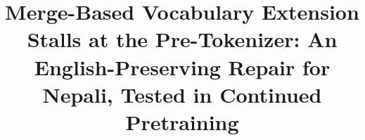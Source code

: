 \documentclass[conference]{IEEEtran}
\begin{document}
\title{Merge-Based Vocabulary Extension Stalls at the Pre-Tokenizer: An English-Preserving Repair for Nepali, Tested in Continued Pretraining}

\author{
}

\maketitle














\appendices

\end{document}
